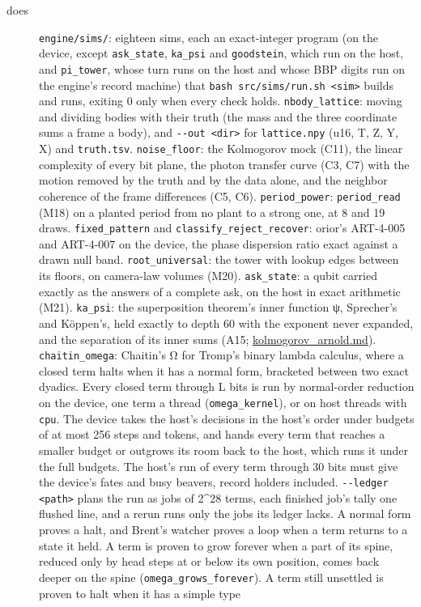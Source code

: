 \begin{description}
\item[{does}] \texttt{engine/\allowbreak{}sims/\allowbreak{}}: eighteen sims, each an exact-integer program (on the device, except \texttt{ask\_\allowbreak{}state}, \texttt{ka\_\allowbreak{}psi} and \texttt{goodstein}, which run on the host, and \texttt{pi\_\allowbreak{}tower}, whose turn runs on the host and whose BBP digits run on the engine's record machine) that \texttt{bash src/\allowbreak{}sims/\allowbreak{}run.\allowbreak{}sh <sim>} builds and runs, exiting 0 only when every check holds. \texttt{nbody\_\allowbreak{}lattice}: moving and dividing bodies with their truth (the mass and the three coordinate sums a frame a body), and \texttt{-\allowbreak{}-\allowbreak{}out <dir>} for \texttt{lattice.\allowbreak{}npy} (u16, T, Z, Y, X) and \texttt{truth.\allowbreak{}tsv}. \texttt{noise\_\allowbreak{}floor}: the Kolmogorov mock (C11), the linear complexity of every bit plane, the photon transfer curve (C3, C7) with the motion removed by the truth and by the data alone, and the neighbor coherence of the frame differences (C5, C6). \texttt{period\_\allowbreak{}power}: \texttt{period\_\allowbreak{}read} (M18) on a planted period from no plant to a strong one, at 8 and 19 draws. \texttt{fixed\_\allowbreak{}pattern} and \texttt{classify\_\allowbreak{}reject\_\allowbreak{}recover}: orior's ART-4-005 and ART-4-007 on the device, the phase dispersion ratio exact against a drawn null band. \texttt{root\_\allowbreak{}universal}: the tower with lookup edges between its floors, on camera-law volumes (M20). \texttt{ask\_\allowbreak{}state}: a qubit carried exactly as the answers of a complete ask, on the host in exact arithmetic (M21). \texttt{ka\_\allowbreak{}psi}: the superposition theorem's inner function ψ, Sprecher's and Köppen's, held exactly to depth 60 with the exponent never expanded, and the separation of its inner sums (A15; \hyperref[chap:kolmogorov-arnold]{kolmogorov\_\allowbreak{}arnold.md}). \texttt{chaitin\_\allowbreak{}omega}: Chaitin's Ω for Tromp's binary lambda calculus, where a closed term halts when it has a normal form, bracketed between two exact dyadics. Every closed term through L bits is run by normal-order reduction on the device, one term a thread (\texttt{omega\_\allowbreak{}kernel}), or on host threads with \texttt{cpu}. The device takes the host's decisions in the host's order under budgets of at most 256 steps and tokens, and hands every term that reaches a smaller budget or outgrows its room back to the host, which runs it under the full budgets. The host's run of every term through 30 bits must give the device's fates and busy beavers, record holders included. \texttt{-\allowbreak{}-\allowbreak{}ledger <path>} plans the run as jobs of 2\textasciicircum{}28 terms, each finished job's tally one flushed line, and a rerun runs only the jobs its ledger lacks. A normal form proves a halt, and Brent's watcher proves a loop when a term returns to a state it held. A term is proven to grow forever when a part of its spine, reduced only by head steps at or below its own position, comes back deeper on the spine (\texttt{omega\_\allowbreak{}grows\_\allowbreak{}forever}). A term still unsettled is proven to halt when it has a simple type 
\end{description}
